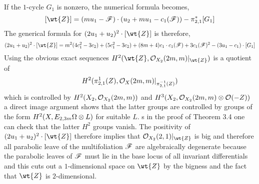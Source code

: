 \documentclass[12pt]{article}
\begin{document}
If the $1$-cycle $G_1$ is nonzero, the numerical formula becomes,
\[ [\wt{Z}] = (m u_1 - \F) \cdot (u_2 + m u_1 - c_1(\F)) - \pi_{2,1}^* [G_1] \]
The generical formula for $(2 u_1 + u_2)^2 \cdot [\wt{Z}]$ is therefore,
\[ (2 u_1 + u_2)^2 \cdot [\wt{Z}] = m^2 (4 c_1^2 - 3 c_2) + (5 c_1^2 - 3 c_2) + (8m + 4) c_1 \cdot c_1(\F) + 3 c_1(\F)^2 - (3 u_1 - c_1) \cdot [G_1] \]
Using the obvious exact sequences $H^2(\wt{Z}, \struct{X_2}(2m, m)|_{\wt{Z}})$ is a quotient of
\[ H^2( \pi_{2,1}^{1}(Z), \mathcal{O}_{X}(2m,m) |_{\pi_{2,1}^{-1}(Z)}) \]
which is controlled by $H^2(X_2, \mathcal{O}_{X_2}(2m,m))$ and $H^3(X_2, \mathcal{O}_{X_2}(2m,m) \otimes \mathcal{O}_{}(-Z))$ a direct image argument shows that the latter groups are controlled by groups of the form $H^2(X, E_{2,3m} \Omega \otimes L)$ for suitable $L$. s in the proof of Theorem 3.4 one can check that the latter $H^2$ groups vanish. The positivity of $(2 u_1 + u_2)^2 \cdot [\wt{Z}]$ therefore implies that $\struct{X_2}(2,1)|_{\wt{Z}}$ is big and therefore all parabolic leave of the multifoliation $\mathscr{F}$ are algebraically degenerate because the parabolic leaves of $\mathscr{F}$ must lie in the base locus of all invariant differentials and this cuts out a $1$-dimensional space on $\wt{Z}$ by the bigness and the fact that $\wt{Z}$ is $2$-dimensional.
\end{document}
